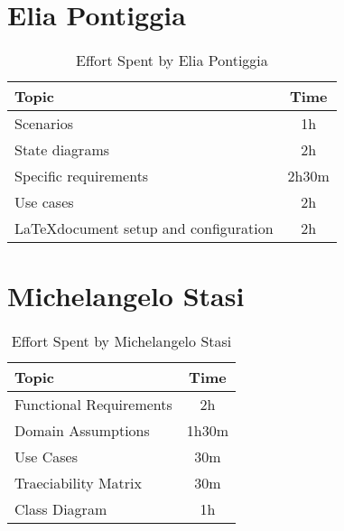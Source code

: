 \section*{Elia Pontiggia}
\begin{table}[ht]
    \centering
    \begin{tabular}{|l|c|}
        \hline
        \textbf{Topic}                                 & \textbf{Time} \\ \hline
        Scenarios                                      & 1h            \\ \hline
        State diagrams                                 & 2h            \\ \hline
        Specific requirements                          & 2h30m         \\ \hline
        Use cases                                      & 2h            \\ \hline
        \LaTeX \space document setup and configuration & 2h            \\ \hline
    \end{tabular}
    \caption{Effort Spent by Elia Pontiggia}
    \label{tab:pontiggia-effort-spent}
\end{table}

\section*{Michelangelo Stasi}
\begin{table}[ht]
    \centering
    \begin{tabular}{|l|c|}
        \hline
        \textbf{Topic}          & \textbf{Time} \\ \hline
        Functional Requirements & 2h            \\ \hline
        Domain Assumptions      & 1h30m         \\ \hline
        Use Cases               & 30m           \\ \hline
        Traeciability Matrix    & 30m           \\ \hline
        Class Diagram           & 1h            \\ \hline
    \end{tabular}
    \caption{Effort Spent by Michelangelo Stasi}
    \label{tab:stasi-effort-spent}
\end{table}
